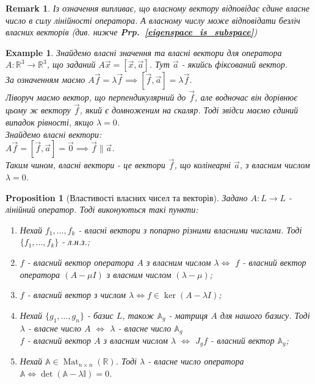 \documentclass[a4paper, 10pt]{article}
\theoremstyle{theoremdd}
\newtheorem{example}[theorem]{Example}
\newtheorem{proposition}[theorem]{Proposition}
\newtheorem{remark}[theorem]{Remark}
\newcommand\prpref[1]{\textbf{Prp.~\ref{#1}}}
\DeclareMathOperator{\Mat}{Mat}
\begin{document}
\begin{remark}
Із означення випливає, що власному вектору відповідає \emph{єдине} власне число в силу лінійності оператора. А власному числу може відповідати безліч власних векторів (див. нижче \prpref{eigenspace_is_subspace})
\end{remark}

\begin{example}
Знайдемо власні значення та власні вектори для оператора $A \colon \mathbb{R}^3 \to \mathbb{R}^3$, що заданий $A\vec{x} = [\vec{x}, \vec{a}]$. Тут $\vec{a}$ - якийсь фіксований вектор.\\
За означенням маємо $A\vec{f} = \lambda \vec{f} \implies [\vec{f},\vec{a}] = \lambda \vec{f}$.\\
Ліворуч маємо вектор, що перпендикулярний до $\vec{f}$, але водночас він дорівнює цьому ж вектору $\vec{f}$, який є домноженим на скаляр. Тоді звідси маємо єдиний випадок рівності, якщо $\lambda = 0$.\\
Знайдемо власні вектори:\\
$A\vec{f} = [\vec{f}, \vec{a}] = \vec{0} \implies \vec{f} \parallel \vec{a}$.\\
Таким чином, власні вектори - це вектори $\vec{f}$, що колінеарні $\vec{a}$, з власним числом $\lambda = 0$.
\end{example}

\begin{proposition}[Властивості власних чисел та векторів]
Задано $A \colon L \to L$ - лінійний оператор. Тоді виконуються такі пункти:
\begin{enumerate}[nosep, wide=0pt, label={\arabic*)}]
\item Нехай $f_1,\dots,f_k$ - власні вектори з попарно різними власними числами. Тоді $\{f_1,\dots,f_k\}$ - л.н.з.;
\item $f$ - власний вектор оператора $A$ з власним числом $\lambda \iff$ $f$ - власний вектор оператора $(A - \mu I)$ з власним числом $(\lambda - \mu)$;
\item $f$ - власний вектор з числом $\lambda \iff f \in \ker(A-\lambda I)$;
\item Нехай $\{g_1,\dots,g_n\}$ - базис $L$, також $\mathbb{A}_g$ - матриця $A$ для нашого базису.
Тоді \\
$\lambda$ - власне число $A$ $\iff$ $\lambda$ - власне число $\mathbb{A}_g$\\
$f$ - власний вектор $A$ з власним числом $\lambda$ $\iff$ $J_g f$ - власний вектор $\mathbb{A}_g$;
\item Нехай $\mathbb{A} \in \Mat_{n \times n}(\mathbb{R})$. Тоді $\lambda$ - власне число оператора $\mathbb{A} \iff \det (\mathbb{A} - \lambda \mathbb{I}) = 0$.
\end{enumerate}
\end{proposition}
\end{document}
